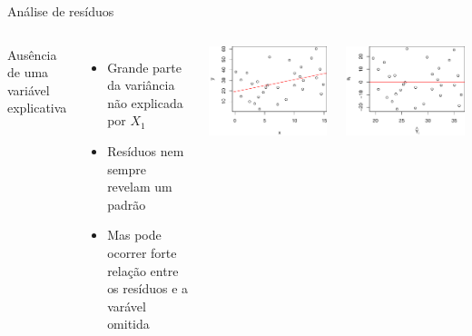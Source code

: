 \documentclass{beamer}\usepackage[]{graphicx}\usepackage[]{color}
\newenvironment{knitrout}{}{} %
\renewenvironment{knitrout}{\setlength{\topsep}{0mm}}{}
\begin{document}
\begin{frame}{Análise de resíduos}

\begin{columns}[c]

\small


Ausência de uma variável explicativa

\bigskip
\begin{itemize}
\item Grande parte da variância não explicada por $X_1$ 
\item Resíduos nem sempre revelam um padrão
\item Mas pode ocorrer forte relação entre os resíduos e a varável omitida
\end{itemize}


\begin{knitrout}
\color{fgcolor}
\includegraphics[width=1\linewidth]{figure/r13-1} 

\includegraphics[width=1\linewidth]{figure/r13-2} 

\end{knitrout}
\end{columns}

\end{frame}
\end{document}
